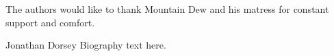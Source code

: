 \documentclass[journal]{IEEEtran}
\begin{document}
The authors would like to thank Mountain Dew and his matress for constant support and comfort.



\ifCLASSOPTIONcaptionsoff
  \newpage
\fi



%
%
%
%
\cite{craig_introduction_2005}
\cite{khalil_nonlinear_2002}
\cite{rawlings_model_2017}
\cite{armstrong_explicit_1986}
\cite{ogata_modern_2010}
\cite{meriam_engineering_1993}
\cite{greenwood_advanced_2006}
\cite{borrelli_predictive_2017}
\cite{boyd_convex_2004}
\cite{slotine_applied_1991}

\printbibliography

\begin{IEEEbiographynophoto}{Jonathan Dorsey}
Biography text here.
\end{IEEEbiographynophoto}
\end{document}
